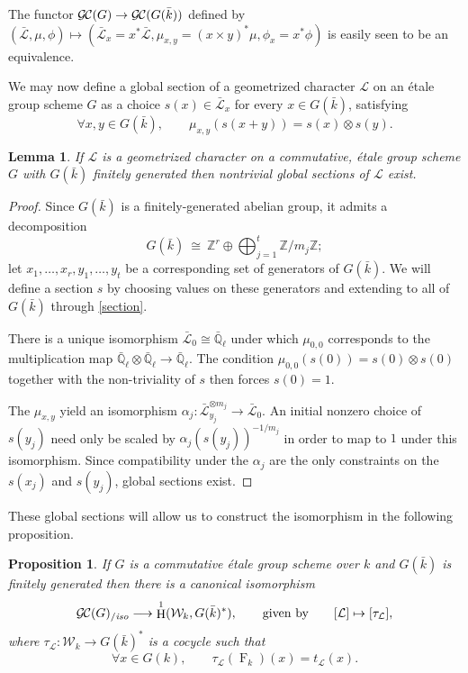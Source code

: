 \documentclass[11pt]{amsart}
\theoremstyle{plain}
\newtheorem{proposition}[theorem]{Proposition}
\newtheorem{lemma}[theorem]{Lemma}
\theoremstyle{definition}
\theoremstyle{remark}
\newcommand{\ZZ}{{\mathbb{Z}}}
\newcommand{\EE}{\mathbb{\bar Q}_\ell}
\newcommand{\bFq}{\bar{k}}
\newcommand{\Fq}{k}
\newcommand{\Frob}[1]{{\operatorname{F}_{#1}}}
\DeclareMathOperator{\Hh}{H}
\newcommand{\cdef}[1]{{{\color{blue}#1}\index{#1}}}
\newcommand{\iso}{{\ \cong\ }}
\newcommand{\cs}[1]{{\mathcal{#1}}}
\newcommand{\gcs}[1]{{\mathcal{\bar #1}}}
\newcommand{\GC}{{\mathcal{G\hskip-0.8pt C}}}
\newcommand{\GCiso}[1]{\GC(#1)_{/\textit{iso}}}
\newcommand{\Weil}[1]{\mathcal{W}_{#1}}
\newcommand{\trFrob}[1]{t_{#1}}
\begin{document}
The functor $\GC(G) \to \GC(G(\bFq))$ defined by
$(\gcs{L}, \mu, \phi) \mapsto (\gcs{L}_x = x^*\gcs{L}, \mu_{x,y} = (x \times y)^* \mu, \phi_x = x^*\phi)$
is easily seen to be an equivalence.  

We may now define a \cdef{global section}
of a geometrized character $\cs{L}$ on an \'etale group scheme $G$ as a choice $s(x) \in \gcs{L}_x$ for every
$x \in G(\bFq)$, satisfying
 \begin{equation}\label{section}
  \forall x,y \in G(\bFq), \qquad \mu_{x,y}(s(x+y)) = s(x)\otimes s(y).
 \end{equation}
 
\begin{lemma}\label{lemma:section}
 If $\cs{L}$ is a geometrized character on a commutative, \'etale group scheme $G$
 with $G(\bFq)$ finitely generated then nontrivial global sections of $\cs{L}$ exist.
\end{lemma}

\begin{proof}
  Since $G(\bFq)$ is a finitely-generated abelian group, it admits a decomposition
  \[
  G(\bFq) \iso \ZZ^r \oplus \bigoplus_{j=1}^t \ZZ / m_j \ZZ;
  \]
  let $x_1, \ldots, x_r, y_1, \ldots, y_t$ be a corresponding set of generators of $G(\bFq)$.
  We will define a section $s$ by choosing values on these generators and extending to all
  of $G(\bFq)$ through \eqref{section}.
  
  There is a unique isomorphism $\gcs{L}_0 \cong \EE$ under which $\mu_{0,0}$ corresponds
  to the multiplication map $\EE \otimes \EE \to \EE$.
  The condition $\mu_{0,0}(s(0)) = s(0) \otimes s(0)$ together with the non-triviality of $s$
  then forces $s(0) = 1$.
  
  The $\mu_{x,y}$ yield an isomorphism $\alpha_j : \gcs{L}_{y_j}^{\otimes m_j} \to \gcs{L}_0$.
  An initial nonzero choice of $s(y_j)$ need only be scaled by $\alpha_j(s(y_j))^{-1/m_j}$ in order to map to
  $1$ under this isomorphism.  Since compatibility under the $\alpha_j$ are the only constraints on the
  $s(x_j)$ and $s(y_j)$, global sections exist.
\end{proof}

These global sections will allow us to construct the isomorphism in the following proposition.

\begin{proposition}\label{prop:etale}
  If $G$ is a commutative \'etale group scheme over $\Fq$ and
  $G(\bFq)$ is finitely generated then there is a canonical
  isomorphism
  \[
  \GCiso{G} \longrightarrow \Hh^1(\Weil{\Fq}, G(\bFq)^*),
  \qquad \text{given by}\qquad
  [\cs{L}] \mapsto [\tau_\cs{L}],
  \]
  where $\tau_\cs{L}: \Weil{\Fq}\to G(\bFq)^*$ is a cocycle such that
  \[
  \forall x\in G(\Fq), \qquad \tau_\cs{L}(\Frob{\Fq})(x) = \trFrob{\cs{L}}(x).
  \]
\end{proposition}
\end{document}
